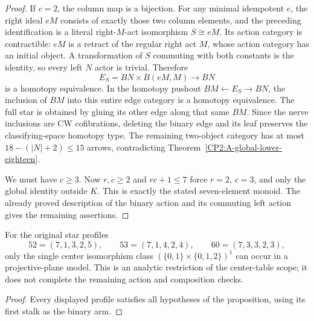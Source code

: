 \begin{proof}
If $c=2$, the column map is a bijection.  For any
minimal idempotent $e$, the right ideal $eM$ consists
of exactly those two column elements, and the preceding
identification is a literal right-$M$-act isomorphism
$S\cong eM$.  Its action category is contractible:
$eM$ is a retract of the regular right act $M$, whose
action category has an initial object.  A transformation
of $S$ commuting with both constants is the identity,
so every left $N$ actor is trivial.  Therefore
\[
 E_S=BN\times B(eM,M)\longrightarrow BN
\]
is a homotopy equivalence.  In the homotopy pushout
$BM\leftarrow E_S\to BN$, the inclusion of $BM$ into
this entire edge category is a homotopy equivalence.
The full star is obtained by gluing its other edge along
that same $BM$.  Since the nerve inclusions are CW
cofibrations, deleting the binary edge and its leaf
preserves the classifying-space homotopy type.  The
remaining two-object category has at most
$18-(|N|+2)\le15$ arrows, contradicting
Theorem~\ref{CP2:A-global-lower-eighteen}.

We must have $c\ge3$.  Now $r,c\ge2$ and
$rc+1\le7$ force $r=2$, $c=3$, and only the global
identity outside $K$.  This is exactly the stated
seven-element monoid.  The already proved description
of the binary action and its commuting left action
gives the remaining assertions.
\end{proof}

\begin{corollary}
\label{CP2:A-star-three-binary-center-scope}
For the original star profiles
\[
 52=(7,1,3,2,5),\qquad
 53=(7,1,4,2,4),\qquad
 60=(7,3,3,2,3),
\]
only the single center isomorphism class
$(\{0,1\}\times\{0,1,2\})^1$ can occur in a
projective-plane model.  This is an analytic restriction
of the center-table scope; it does not complete the
remaining action and composition checks.
\end{corollary}
\begin{proof}
Every displayed profile satisfies all hypotheses of
the proposition, using its first stalk as the binary arm.
\end{proof}
